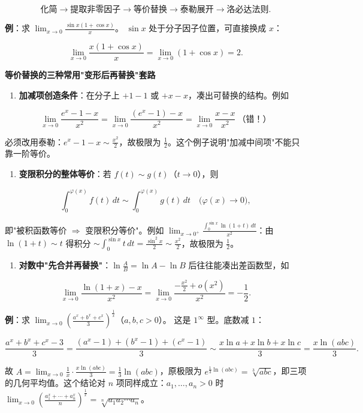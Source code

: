 \documentclass[11pt,openany,UTF8]{ctexbook}
\begin{document}
\[化简 \to 提取非零因子 \to 等价替换 \to 泰勒展开 \to 洛必达法则.\]

\textbf{例}：求 $\lim_{x\to 0}\frac{\sin x(1+\cos x)}{x}$。 $\sin x$ 处于分子因子位置，可直接换成 $x$：

\[\lim_{x\to 0}\frac{x(1+\cos x)}{x}=\lim_{x\to 0}(1+\cos x)=2 .\]

\textbf{等价替换的三种常用"变形后再替换"套路}

\begin{enumerate}
\item \textbf{加减项创造条件}：在分子上 $+1-1$ 或 $+x-x$，凑出可替换的结构。例如
\end{enumerate}
\[\lim_{x\to 0}\frac{e^{x}-1-x}{x^{2}}=\lim_{x\to 0}\frac{(e^{x}-1)-x}{x^{2}}=\lim_{x\to 0}\frac{x-x}{x^{2}}\ \text{（错！）}\]

必须改用泰勒：$e^{x}-1-x\sim\frac{x^{2}}{2}$，故极限为 $\frac12$。这个例子说明"加减中间项"不能只靠一阶等价。

\begin{enumerate}
\item \textbf{变限积分的整体等价}：若 $f(t)\sim g(t)$（$t\to 0$），则
\end{enumerate}
\[\int_0^{\varphi(x)}f(t)\,dt \sim \int_0^{\varphi(x)}g(t)\,dt \quad\bigl(\varphi(x)\to 0\bigr),\]

即"被积函数等价 $\Rightarrow$ 变限积分等价"。例如 $\lim_{x\to 0^+}\frac{\int_0^{\sin x}\ln(1+t)\,dt}{x^{2}}$：由 $\ln(1+t)\sim t$ 得积分 $\sim\int_0^{\sin x}t\,dt=\frac{\sin^{2}x}{2}\sim\frac{x^{2}}{2}$，故极限为 $\frac12$。

\begin{enumerate}
\item \textbf{对数中"先合并再替换"}：$\ln\frac{A}{B}=\ln A-\ln B$ 后往往能凑出差函数型，如
\end{enumerate}
\[\lim_{x\to 0}\frac{\ln(1+x)-x}{x^{2}}=\lim_{x\to 0}\frac{-\frac{x^{2}}{2}+o(x^{2})}{x^{2}}=-\frac12 .\]

\textbf{例}：求 $\lim_{x\to 0}\left(\frac{a^{x}+b^{x}+c^{x}}{3}\right)^{\frac1x}$（$a,b,c>0$）。 这是 $1^\infty$ 型。底数减 $1$：

\[\frac{a^{x}+b^{x}+c^{x}-3}{3}=\frac{(a^{x}-1)+(b^{x}-1)+(c^{x}-1)}{3}\sim\frac{x\ln a+x\ln b+x\ln c}{3}=\frac{x\ln(abc)}{3}.\]

故 $A=\lim_{x\to 0}\frac1x\cdot\frac{x\ln(abc)}{3}=\frac13\ln(abc)$，原极限为 $e^{\frac13\ln(abc)}=\sqrt[3]{abc}$，即三项的几何平均值。这个结论对 $n$ 项同样成立：$a_1,\dots,a_n>0$ 时 $\lim_{x\to 0}\left(\frac{a_1^{x}+\cdots+a_n^{x}}{n}\right)^{\frac1x}=\sqrt[n]{a_1a_2\cdots a_n}$。
\end{document}
